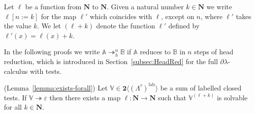 \documentclass{LMCS}
\newcommand{\nat}{\mathbf{N}}
\newcommand{\bool}{\mathbf{2}}
\newcommand{\dlam}{\ensuremath{\partial\lambda}}
\newcommand{\Set}[1]{\Lambda^{#1}}
\newcommand{\msto}{\twoheadrightarrow}
\newcommand{\sA}{\mathbb{A}}
\newcommand{\sB}{\mathbb{B}}
\newcommand{\sV}{\mathbb{V}}
\newcommand{\gt}{\ensuremath{\tau}}
\newcommand\lab{\mathrm{lab}}
\begin{document}
Let $\ell$ be a function from $\nat$ to $\nat$.
Given a natural number $k\in\nat$ we write $\ell[n:=k]$ for the map $\ell'$ which coincides with $\ell$, 
except on $n$, where $\ell'$ takes the value $k$.
We let $(\ell + k)$ denote the function $\ell'$ defined by $\ell'(x) = \ell(x) + k$.
 
In the following proofs we write $\sA\msto_h^n \sB$ if $\sA$ reduces to $\sB$ in $n$ steps of head reduction, which is
introduced in Section~\ref{subsec:HeadRed} for the full $\dlam$-calculus with tests.


\begin{lem}(Lemma~\ref{lemma:exists-forall})
Let $\sV\in\bool\langle(\Set{\gt})^\lab\rangle$ be a sum of labelled closed tests. 
If $\sV\msto\varepsilon$ then there exists a map $\ell:\nat\to\nat$ such that $\sV^{(\ell+k)}$ is solvable for all $k\in\nat$.
\end{lem}
\end{document}
